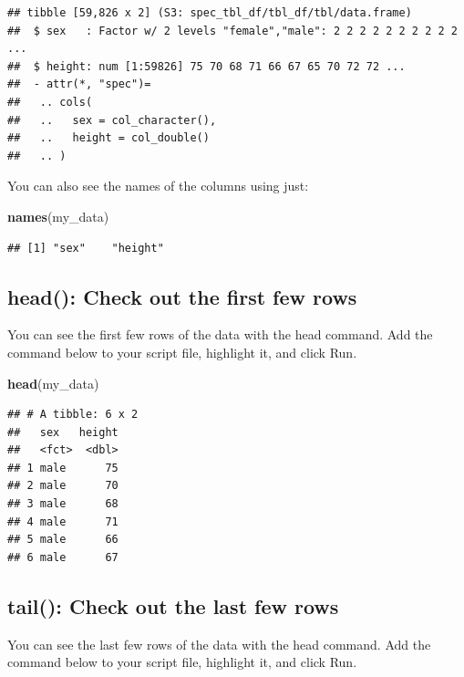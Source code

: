 \documentclass[
]{krantz}
\makeatletter
\newenvironment{Shaded}{\begin{snugshade}}{\end{snugshade}}
\newcommand{\KeywordTok}[1]{\textcolor[rgb]{0.27,0.27,0.27}{\textbf{#1}}}
\newcommand{\NormalTok}[1]{#1}
\newenvironment{kframe}{%
\medskip{}
\setlength{\fboxsep}{.8em}
 \def\at@end@of@kframe{}%
 \ifinner\ifhmode%
  \def\at@end@of@kframe{\end{minipage}}%
  \begin{minipage}{\columnwidth}%
 \fi\fi%
 \def\FrameCommand##1{\hskip\@totalleftmargin \hskip-\fboxsep
 \colorbox{shadecolor}{##1}\hskip-\fboxsep
     \hskip-\linewidth \hskip-\@totalleftmargin \hskip\columnwidth}%
 \MakeFramed {\advance\hsize-\width
   \@totalleftmargin\z@ \linewidth\hsize
   \@setminipage}}%
 {\par\unskip\endMakeFramed%
 \at@end@of@kframe}
\renewenvironment{Shaded}{\begin{kframe}}{\end{kframe}}
\makeatother
\begin{document}
\begin{verbatim}
## tibble [59,826 x 2] (S3: spec_tbl_df/tbl_df/tbl/data.frame)
##  $ sex   : Factor w/ 2 levels "female","male": 2 2 2 2 2 2 2 2 2 2 ...
##  $ height: num [1:59826] 75 70 68 71 66 67 65 70 72 72 ...
##  - attr(*, "spec")=
##   .. cols(
##   ..   sex = col_character(),
##   ..   height = col_double()
##   .. )
\end{verbatim}

You can also see the names of the columns using just:

\begin{Shaded}
\begin{Highlighting}[]
\KeywordTok{names}\NormalTok{(my_data)}
\end{Highlighting}
\end{Shaded}

\begin{verbatim}
## [1] "sex"    "height"
\end{verbatim}

\hypertarget{head-check-out-the-first-few-rows}{%
\subsection{head(): Check out the first few rows}\label{head-check-out-the-first-few-rows}}

You can see the first few rows of the data with the head command. Add the command below to your script file, highlight it, and click Run.

\begin{Shaded}
\begin{Highlighting}[]
\KeywordTok{head}\NormalTok{(my_data)}
\end{Highlighting}
\end{Shaded}

\begin{verbatim}
## # A tibble: 6 x 2
##   sex   height
##   <fct>  <dbl>
## 1 male      75
## 2 male      70
## 3 male      68
## 4 male      71
## 5 male      66
## 6 male      67
\end{verbatim}

\hypertarget{tail-check-out-the-last-few-rows}{%
\subsection{tail(): Check out the last few rows}\label{tail-check-out-the-last-few-rows}}

You can see the last few rows of the data with the head command. Add the command below to your script file, highlight it, and click Run.
\end{document}
